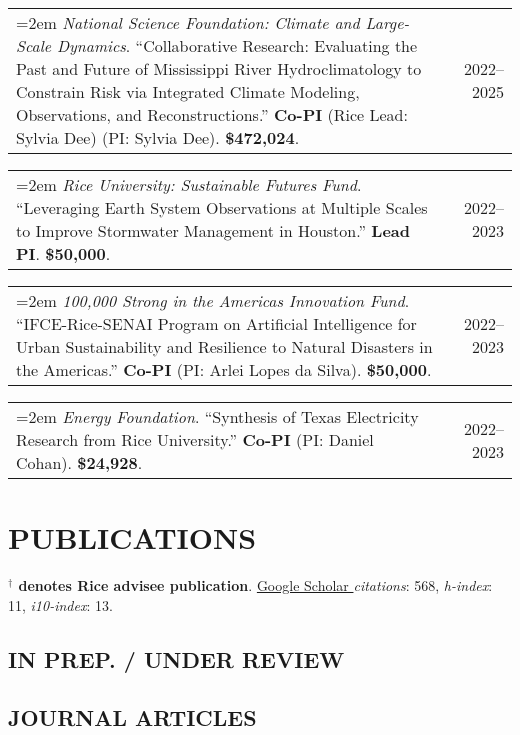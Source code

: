 \documentclass[10pt,oneside]{article}
\makeatletter
\newenvironment{alignedentrieshang}[1][2em]{%
  \noindent%
}{%
}
\newcommand{\hangingitem}[2]{%
  \noindent%
  \begin{tabular*}{\textwidth}{@{}p{0.85\textwidth}@{\extracolsep{\fill}}r@{}}%
    \hangindent=2em \hangafter=1 #1 & #2%
  \end{tabular*}%
}
\makeatother
\begin{document}
\begin{alignedentrieshang}
\hangingitem{\textit{National Science Foundation}\textit{: Climate and Large-Scale Dynamics}. ``Collaborative Research: Evaluating the Past and Future of Mississippi River Hydroclimatology to Constrain Risk via Integrated Climate Modeling, Observations, and Reconstructions.'' \textbf{Co-PI} (Rice Lead: Sylvia Dee) (PI: Sylvia Dee). \textbf{\$472,024}.}{2022--2025}

\hangingitem{\textit{Rice University}\textit{: Sustainable Futures Fund}. ``Leveraging Earth System Observations at Multiple Scales to Improve Stormwater Management in Houston.'' \textbf{Lead PI}. \textbf{\$50,000}.}{2022--2023}

\hangingitem{\textit{100,000 Strong in the Americas Innovation Fund}. ``IFCE-Rice-SENAI Program on Artificial Intelligence for Urban Sustainability and Resilience to Natural Disasters in the Americas.'' \textbf{Co-PI} (PI: Arlei Lopes da Silva). \textbf{\$50,000}.}{2022--2023}

\hangingitem{\textit{Energy Foundation}. ``Synthesis of Texas Electricity Research from Rice University.'' \textbf{Co-PI} (PI: Daniel Cohan). \textbf{\$24,928}.}{2022--2023}

\end{alignedentrieshang}


\section{PUBLICATIONS}

{\textcolor{RiceBlue}{\textbf{$^\mathbf{\dagger}$ denotes Rice advisee publication}}}.
\href{https://scholar.google.com/citations?user=6ifLBBsAAAAJ}{Google Scholar \aiGoogleScholar} \textit{citations}: 568, \textit{h-index}: 11, \textit{i10-index}: 13.
\medskip


\subsection{IN PREP. / UNDER REVIEW}

\printbibliography[filter=ispreprint, heading=none]

\subsection{JOURNAL ARTICLES}

\printbibliography[heading=none, type=article]
\end{document}
